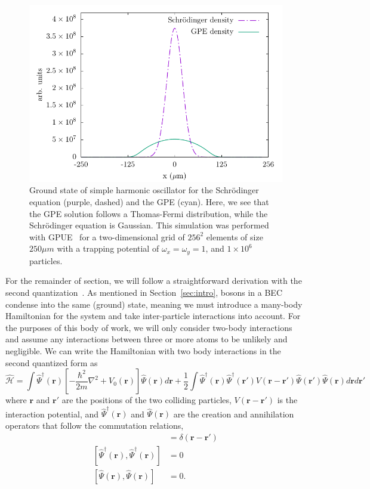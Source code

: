 \begin{figure}
\center \includegraphics[width = \textwidth]{data/qs/SHO/SHO.pdf}

\caption{Ground state of simple harmonic oscillator for the Schr\"odinger equation (purple, dashed) and the GPE (cyan).
Here, we see that the GPE solution follows a Thomas-Fermi distribution, while the Schr\"odinger equation is Gaussian.
This simulation was performed with GPUE~\cite{schloss2018} for a two-dimensional grid of $256^2$ elements of size $250 \mu m$ with a trapping potential of $\omega_x = \omega_y = 1$, and $1\times 10^6$ particles.}
\label{fig:TF}
\end{figure}


For the remainder of section, we will follow a straightforward derivation with the second quantization~\cite{aversa2008}.
As mentioned in Section~\ref{sec:intro}, bosons in a BEC condense into the same (ground) state, meaning we must introduce a many-body Hamiltonian for the system and take inter-particle interactions into account.
For the purposes of this body of work, we will only consider two-body interactions and assume any interactions between three or more atoms to be unlikely and negligible.
We can write the Hamiltonian with two body interactions in the second quantized form as
\begin{equation}
    \mathcal{\hat H} = \int \hat \Psi^\dagger(\mathbf{r})\left[-\frac{\hbar^2}{2m}\nabla^2 + V_0(\mathbf{r}) \right]\hat \Psi(\mathbf{r}) d\mathbf{r} + \frac{1}{2} \int  \hat \Psi^\dagger(\mathbf{r}) \hat \Psi^\dagger(\mathbf{r'}) V(\mathbf{r} - \mathbf{r'})\hat \Psi(\mathbf{r'}) \hat \Psi(\mathbf{r}) d\mathbf{r} d\mathbf{r'}
    \label{eqn:2nd}
\end{equation}
where $\mathbf{r}$ and $\mathbf{r'}$ are the positions of the two colliding particles, $V(\mathbf{r}-\mathbf{r'})$ is the interaction potential, and $\hat \Psi^\dagger(\mathbf{r})$ and $\hat \Psi(\mathbf{r})$ are the creation and annihilation operators that follow the commutation relations,
\begin{align}
 [\hat \Psi(\mathbf{r}),\hat \Psi^\dagger(\mathbf{r})] &= \delta(\mathbf{r} - \mathbf{r'}) \\
 [\hat \Psi^\dagger(\mathbf{r}),\hat \Psi^\dagger(\mathbf{r})] &= 0 \\
 [\hat \Psi(\mathbf{r}),\hat \Psi(\mathbf{r})] &= 0.
\end{align}

